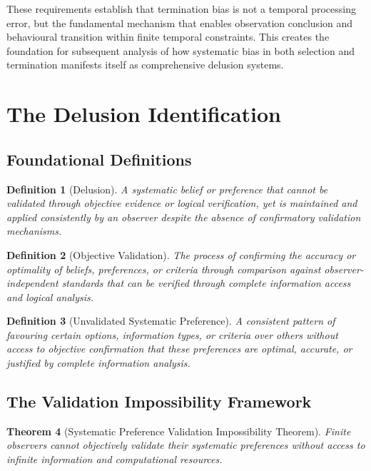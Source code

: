 \documentclass[12pt,a4paper]{article}
\newtheorem{theorem}{Theorem}[section]
\newtheorem{definition}[theorem]{Definition}
\begin{document}
These requirements establish that termination bias is not a temporal processing error, but the fundamental mechanism that enables observation conclusion and behavioural transition within finite temporal constraints. This creates the foundation for subsequent analysis of how systematic bias in both selection and termination manifests itself as comprehensive delusion systems.

\section{The Delusion Identification}

\subsection{Foundational Definitions}

\begin{definition}[Delusion]
A systematic belief or preference that cannot be validated through objective evidence or logical verification, yet is maintained and applied consistently by an observer despite the absence of confirmatory validation mechanisms.
\end{definition}

\begin{definition}[Objective Validation]
The process of confirming the accuracy or optimality of beliefs, preferences, or criteria through comparison against observer-independent standards that can be verified through complete information access and logical analysis.
\end{definition}

\begin{definition}[Unvalidated Systematic Preference]
A consistent pattern of favouring certain options, information types, or criteria over others without access to objective confirmation that these preferences are optimal, accurate, or justified by complete information analysis.
\end{definition}

\subsection{The Validation Impossibility Framework}

\begin{theorem}[Systematic Preference Validation Impossibility Theorem]
Finite observers cannot objectively validate their systematic preferences without access to infinite information and computational resources.
\end{theorem}
\end{document}
